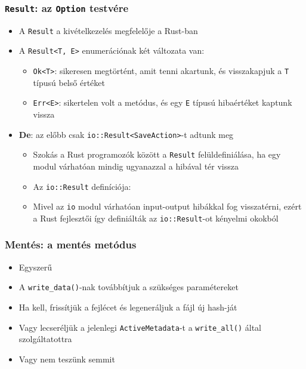 \documentclass{beamer}
\begin{document}
    \begin{frame}[fragile]
        \frametitle{\texttt{Result}: az \texttt{Option} testvére}

        \begin{itemize}
            \item A \texttt{Result} a kivételkezelés megfelelője a Rust-ban
            \item A \texttt{Result<T, E>} enumerációnak két változata van: \begin{itemize}
                \item \texttt{Ok<T>}: sikeresen megtörtént, amit tenni akartunk, és visszakapjuk a \texttt{T} típusú belső értéket
                \item \texttt{Err<E>}: sikertelen volt a metódus, és egy \texttt{E} típusú hibaértéket kaptunk vissza
            \end{itemize}
            \item \textbf{De}: az előbb csak \texttt{io::Result<SaveAction>}-t adtunk meg \begin{itemize}
                \item Szokás a Rust programozók között a \texttt{Result} felüldefiniálása, ha egy modul várhatóan mindig ugyanazzal a hibával tér vissza
                \item Az \texttt{io::Result} definíciója: 
                \item Mivel az \texttt{io} modul várhatóan input-output hibákkal fog visszatérni, ezért a Rust fejlesztői így definiálták az \texttt{io::Result}-ot kényelmi okokból
            \end{itemize}
        \end{itemize}
    \end{frame}

    \begin{frame}[fragile]
        \frametitle{Mentés: a mentés metódus}

        \begin{itemize}
            \item Egyszerű
            \item A \texttt{write\_data()}-nak továbbítjuk a szükséges paramétereket
            \item Ha kell, frissítjük a fejlécet és legeneráljuk a fájl új hash-ját
            \item Vagy lecseréljük a jelenlegi \texttt{ActiveMetadata}-t a \texttt{write\_all()} által szolgáltatottra
            \item Vagy nem teszünk semmit
        \end{itemize}
    \end{frame}
\end{document}
